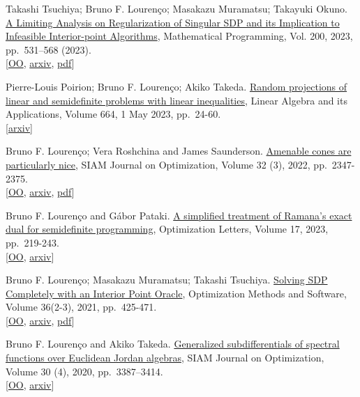 Takashi Tsuchiya; Bruno F. Lourenço; Masakazu Muramatsu; Takayuki Okuno.
\href{https://link.springer.com/article/10.1007/s10107-022-01891-8}{A
Limiting Analysis on Regularization of Singular SDP and its Implication
to Infeasible Interior-point Algorithms}, Mathematical Programming, Vol.
200, 2023, pp.~531--568 (2023).\\
{[}\href{https://optimization-online.org/2019/12/7528/}{OO},
\href{https://arxiv.org/abs/1912.09696}{arxiv},
\href{/papers/limiting_analysis_SDP.pdf}{pdf}{]}

Pierre-Louis Poirion; Bruno F. Lourenço; Akiko Takeda.
\href{https://www.sciencedirect.com/science/article/abs/pii/S0024379523000198}{Random
projections of linear and semidefinite problems with linear
inequalities}, Linear Algebra and its Applications, Volume 664, 1 May
2023, pp.~24-60.\\
{[}\href{https://arxiv.org/abs/2007.00242}{arxiv}{]}

Bruno F. Lourenço; Vera Roshchina and James Saunderson.
\href{https://epubs.siam.org/doi/abs/10.1137/20M138466X}{Amenable cones
are particularly nice}, SIAM Journal on Optimization, Volume 32 (3),
2022, pp.~2347-2375.\\
{[}\href{http://www.optimization-online.org/DB_HTML/2020/11/8120.html}{OO},
\href{https://arxiv.org/abs/2011.07745}{arxiv},
\href{/papers/amenable_nice.pdf}{pdf}{]}

Bruno F. Lourenço and Gábor Pataki.
\href{https://link.springer.com/article/10.1007/s11590-022-01898-2}{A
simplified treatment of Ramana's exact dual for semidefinite
programming}, Optimization Letters, Volume 17, 2023, pp.~219-243.\\
{[}\href{http://www.optimization-online.org/DB_HTML/2020/06/7846.html}{OO},
\href{https://arxiv.org/abs/2205.13596}{arxiv}{]}

Bruno F. Lourenço; Masakazu Muramatsu; Takashi Tsuchiya.
\href{https://www.tandfonline.com/doi/full/10.1080/10556788.2020.1850720}{Solving
SDP Completely with an Interior Point Oracle}, Optimization Methods and
Software, Volume 36(2-3), 2021, pp.~425-471.\\
{[}\href{http://www.optimization-online.org/DB_HTML/2015/06/4982.html}{OO},
\href{https://arxiv.org/abs/1507.08065}{arxiv},
\href{/papers/solving_completely.pdf}{pdf}{]}

Bruno F. Lourenço and Akiko Takeda.
\href{https://epubs.siam.org/doi/abs/10.1137/19M1245001}{Generalized
subdifferentials of spectral functions over Euclidean Jordan algebras},
SIAM Journal on Optimization, Volume 30 (4), 2020, pp.~3387--3414.\\
{[}\href{http://www.optimization-online.org/DB_HTML/2019/01/7046.html}{OO},
\href{https://arxiv.org/abs/1902.05270}{arxiv}{]}

